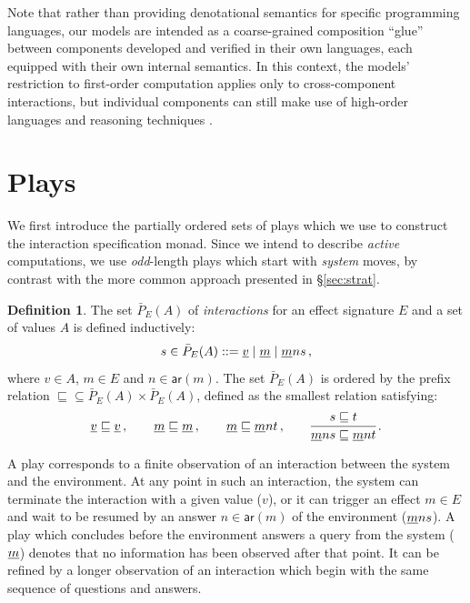 \documentclass[11pt,oneside,draft]{book}
\theoremstyle{definition}
\newtheorem{definition}[theorem]{Definition}
\newcommand{\kw}[1]{\ensuremath{ \mathsf{#1} }}
\newcommand{\ul}[1]{%
  \underline{\smash{#1}}
}
\begin{document}
Note that rather than providing
denotational semantics for specific programming
languages, our models are intended as a coarse-grained composition
``glue'' between components developed and verified in their own
languages, each equipped with their own internal semantics.
In this context,
the models' restriction to first-order computation
applies only to cross-component interactions,
but individual components can still make use of
high-order languages and reasoning techniques
\citep{hosl-fo}.


\section{Plays} \label{sec:intm:plays} %

We first introduce the partially ordered sets of plays
which we use to construct the interaction specification monad.
Since we intend to describe \emph{active} computations,
we use \emph{odd}-length plays which start with \emph{system} moves,
by contrast with the more common approach
presented in \S\ref{sec:strat}.

\begin{definition}
The set $\bar{P}_E(A)$ of \emph{interactions}
for an effect signature $E$ and a set of values $A$
is defined inductively:
\[
  s \in \bar{P}_E(A) ::=
    \ul{v} \mid
    \ul{m} \mid
    \ul{m} n s \,,
\]
where $v \in A$, $m \in E$ and $n \in \kw{ar}(m)$.
The set $\bar{P}_E(A)$ is ordered by the prefix relation
${\sqsubseteq} \subseteq \bar{P}_E(A) \times \bar{P}_E(A)$,
defined
as the smallest relation satisfying:
\[
  \ul{v} \sqsubseteq \ul{v} \,, \qquad
  \ul{m} \sqsubseteq \ul{m} \,, \qquad
  \ul{m} \sqsubseteq \ul{m} n t \,, \qquad
  \begin{prooftree}
    \hypo{s \sqsubseteq t}
    \infer1{\ul{m} n s \sqsubseteq \ul{m} n t}
  \end{prooftree} \,.
\]
\end{definition}

A play corresponds to a finite observation of
an interaction between the system and the environment.
At any point in such an interaction,
the system can terminate the interaction with a given value ($v$),
or it can trigger an effect $m \in E$ and
wait to be resumed by
an answer $n \in \kw{ar}(m)$ of the environment
($\ul{m} n s$).
%
A play which concludes before
the environment answers a query from the system ($\ul{m}$)
denotes that no information has been observed after that point.
It can be refined by a longer observation
of an interaction which begin with the same sequence of
questions and answers.
\end{document}
